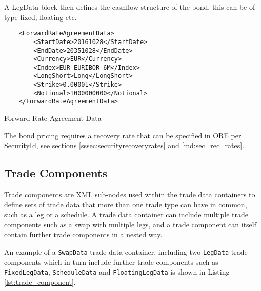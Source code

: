 A LegData block then defines the cashflow structure of the bond, this can be of type fixed, floating etc.

\begin{listing}[H]
\begin{verbatim}
    <ForwardRateAgreementData>
        <StartDate>20161028</StartDate>
        <EndDate>20351028</EndDate>
        <Currency>EUR</Currency>
        <Index>EUR-EURIBOR-6M</Index>
        <LongShort>Long</LongShort>
        <Strike>0.00001</Strike>
        <Notional>1000000000</Notional>
    </ForwardRateAgreementData>
\end{verbatim}
\caption{Forward Rate Agreement Data}
\label{lst:ForwardRateAgreementdata}
\end{listing}

The bond pricing requires a recovery rate that can be specified in ORE per SecurityId, see sections \ref{sssec:securityrecoveryrates} and \ref{md:sec_rec_rates}. 

\subsection{Trade Components}

Trade components are XML sub-nodes used within the trade data containers to define sets of trade data that more than one
trade type can have in common, such as a leg or a schedule. A trade data container can include multiple trade components
such as a swap with multiple legs, and a trade component can itself contain further trade components in a nested way.

\vspace{1em}

An example of a \lstinline!SwapData! trade data container, including two \lstinline!LegData! trade components which in
turn include further trade components such as \lstinline!FixedLegData!, \lstinline!ScheduleData! and
\lstinline!FloatingLegData! is shown in Listing \ref{lst:trade_component}.

